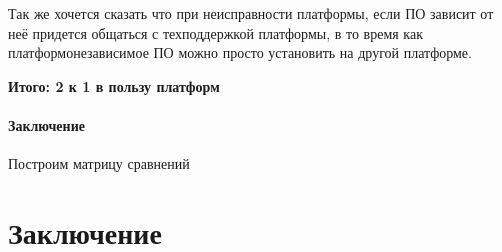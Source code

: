 \documentclass[a4paper,12pt]{report} %
\begin{document}
Так же хочется сказать что при неисправности платформы, если ПО зависит от неё
придется общаться с техподдержкой платформы, в то время как платформонезависимое
ПО можно просто установить на другой платформе.

\bfseries{Итого:} 2 к 1 в пользу платформ
\subsubsection{Заключение}
Построим матрицу сравнений
\newpage
\chapter{Заключение}
\end{document}
